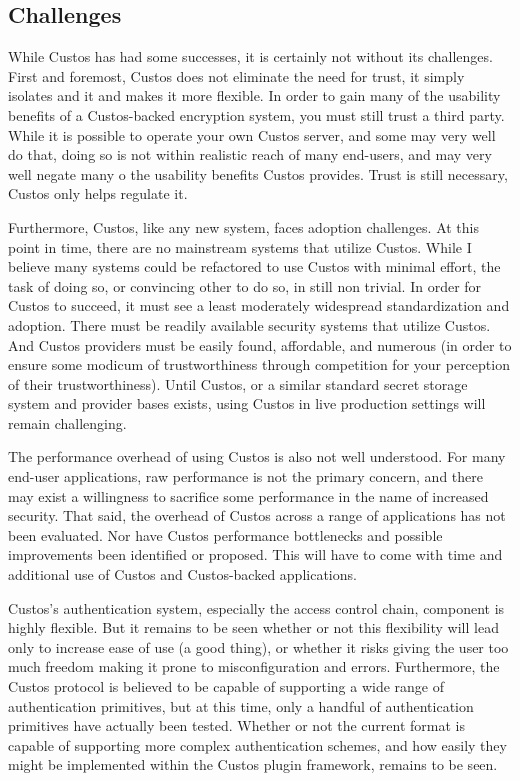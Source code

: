 \subsection{Challenges}

While Custos has had some successes, it is certainly not without its
challenges. First and foremost, Custos does not eliminate the need for
trust, it simply isolates and it and makes it more flexible. In order
to gain many of the usability benefits of a Custos-backed encryption
system, you must still trust a third party. While it is possible to
operate your own Custos server, and some may very well do that, doing
so is not within realistic reach of many end-users, and may very well
negate many o the usability benefits Custos provides. Trust is still
necessary, Custos only helps regulate it.

Furthermore, Custos, like any new system, faces adoption
challenges. At this point in time, there are no mainstream systems
that utilize Custos. While I believe many systems could be refactored
to use Custos with minimal effort, the task of doing so, or convincing
other to do so, in still non trivial. In order for Custos to succeed,
it must see a least moderately widespread standardization and
adoption. There must be readily available security systems that
utilize Custos. And Custos providers must be easily found, affordable,
and numerous (in order to ensure some modicum of trustworthiness
through competition for your perception of their
trustworthiness). Until Custos, or a similar standard secret storage
system and provider bases exists, using Custos in live production
settings will remain challenging.

The performance overhead of using Custos is also not well
understood. For many end-user applications, raw performance is not the
primary concern, and there may exist a willingness to sacrifice some
performance in the name of increased security. That said, the overhead
of Custos across a range of applications has not been evaluated. Nor
have Custos performance bottlenecks and possible improvements been
identified or proposed. This will have to come with time and
additional use of Custos and Custos-backed applications.

Custos's authentication system, especially the access control chain,
component is highly flexible. But it remains to be seen whether or not
this flexibility will lead only to increase ease of use (a good
thing), or whether it risks giving the user too much freedom making it
prone to misconfiguration and errors. Furthermore, the Custos protocol
is believed to be capable of supporting a wide range of authentication
primitives, but at this time, only a handful of authentication
primitives have actually been tested. Whether or not the current
format is capable of supporting more complex authentication schemes,
and how easily they might be implemented within the Custos plugin
framework, remains to be seen.

